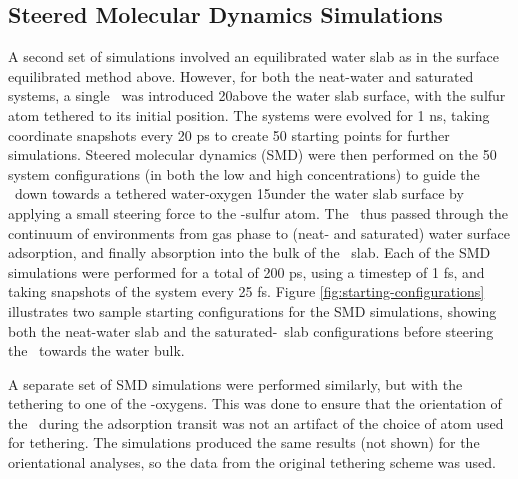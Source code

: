 \subsection{Steered Molecular Dynamics Simulations}

A second set of simulations involved an equilibrated water slab as in the surface equilibrated method above. However, for both the neat-water and saturated systems, a single \suldiox~was introduced 20\angs above the water slab surface, with the sulfur atom tethered to its initial position. The systems were evolved for 1 ns, taking coordinate snapshots every 20 ps to create 50 starting points for further simulations. Steered molecular dynamics (SMD) were then performed on the 50 system configurations (in both the low and high concentrations) to guide the \suldiox~down towards a tethered water-oxygen 15\angs under the water slab surface by applying a small steering force to the \suldiox-sulfur atom.\cite{Isralewitz2001} The \suldiox~thus passed through the continuum of environments from gas phase to (neat- and saturated) water surface adsorption, and finally absorption into the bulk of the \wat~slab. Each of the SMD simulations were performed for a total of 200 ps, using a timestep of 1 fs, and taking snapshots of the system every 25 fs. Figure \ref{fig:starting-configurations} illustrates two sample starting configurations for the SMD simulations, showing both the neat-water slab and the saturated-\wat~slab configurations before steering the \suldiox~towards the water bulk.

A separate set of SMD simulations were performed similarly, but with the tethering to one of the \suldiox-oxygens. This was done to ensure that the orientation of the \suldiox~during the adsorption transit was not an artifact of the choice of atom used for tethering. The simulations produced the same results (not shown) for the orientational analyses, so the data from the original tethering scheme was used.

